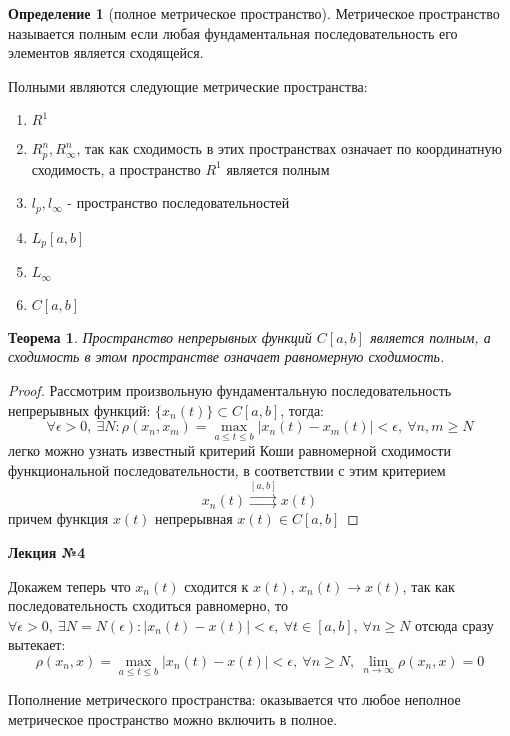 \documentclass[14pt,a4paper]{extarticle}
\newtheorem{theorem}{Теорема}[section]
\theoremstyle{definition}
\newtheorem{definition}{Определение}[section]
\theoremstyle{remark}
\renewcommand{\[}{\begin{dmath*}[compact]}
\renewcommand{\]}{\end{dmath*}}
\newcommand{\sep}{ , \ \allowbreak }
\begin{document}
\begin{definition}[полное метрическое пространство]
  Метрическое пространство называется полным если любая
  фундаментальная последовательность его элементов является сходящейся.
\end{definition}

Полными являются следующие метрические пространства:

\begin{enumerate}
  \item $R^1$
  \item $R_p^n, R_\infty^n$, так как сходимость в этих пространствах означает
  по координатную сходимость, а пространство $R^1$ является полным
  \item $l_p, l_\infty$ - пространство последовательностей %
  \item $L_p[a,b]$ %
  \item $L_\infty$ %
  \item $C[a,b]$
\end{enumerate}

\begin{theorem}
  Пространство непрерывных функций $C[a,b]$ является полным,
  а сходимость в этом пространстве означает равномерную сходимость.
\end{theorem}

\begin{proof}
  Рассмотрим произвольную фундаментальную последовательность
  непрерывных функций: $\{x_n(t)\} \subset C[a, b]$, тогда:
  \[ \forall \epsilon > 0 \sep \exists N: \rho(x_n, x_m) =
  \max_{a \leq t \leq b} |x_n(t) - x_m(t)| < \epsilon \sep
  {\forall n, m \geq N} \]
  легко можно узнать известный критерий Коши равномерной сходимости
  функциональной последовательности, в соответствии с этим критерием
  \[ x_n(t) \overset{[a,b]}{\rightrightarrows} x(t)\]
  причем функция $x(t)$ непрерывная $x(t)\in C[a,b]$
\end{proof}

\textbf{Лекция №4}

Докажем теперь что $x_n(t)$ сходится к $x(t)$, $x_n(t) \to x(t)$,
так как последовательность сходиться равномерно, то
$ \forall \epsilon > 0 \sep \exists N = N(\epsilon): |x_n(t) - x(t)| <
\epsilon \sep \forall t \in [a,b] \sep \forall n \geq N$
отсюда сразу вытекает:
\[ \rho(x_n, x) = \max_{a \leq t \leq b} |x_n(t) - x(t)| < \epsilon \sep
{\forall n \geq N} \sep {\lim_{n \to \infty} \rho(x_n,x) = 0}\]

Пополнение метрического пространства: оказывается что любое неполное
метрическое пространство можно включить в полное.
\end{document}

